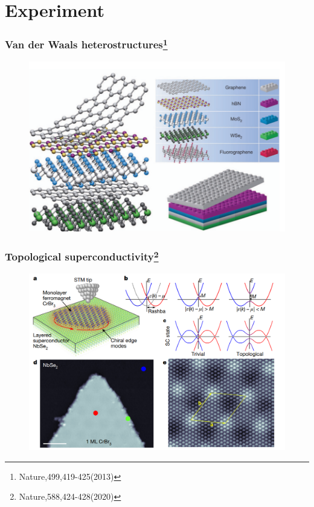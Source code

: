 \documentclass{beamer}
\begin{document}
\section{Experiment}
\begin{frame}
\frametitle{Van der Waals heterostructures\footnote{Nature,499,419-425(2013)}}
\begin{figure}
\centering
\includegraphics[scale=0.5]{pic/p17.png}
\end{figure}
\end{frame}
\begin{frame}
\frametitle{Topological superconductivity\footnote{Nature,588,424-428(2020)}}
\begin{figure}
\centering
\includegraphics[scale=0.5]{pic/p18.png}
\end{figure}
\end{frame}
\end{document}
